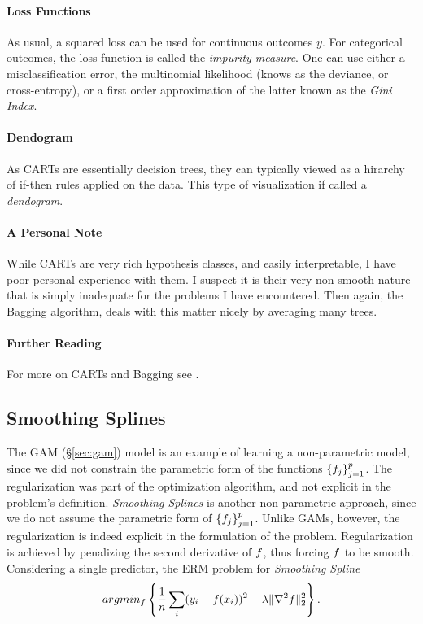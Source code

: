 \paragraph{Loss Functions}
As usual, a squared loss can be used for continuous outcomes $y$.
For categorical outcomes, the loss function is called the \emph{impurity measure}.
One can use either a misclassification error, the multinomial likelihood (knows as the deviance, or cross-entropy), or a first order approximation of the latter known as the \emph{Gini Index}.


\paragraph{Dendogram}
As CARTs are essentially decision trees, they can typically viewed as a hirarchy of if-then rules applied on the data.
This type of visualization if called a \emph{dendogram}.

\paragraph{A Personal Note}
While CARTs are very rich hypothesis classes, and easily interpretable, I have poor personal experience with them. 
I suspect it is their very non smooth nature that is simply inadequate for the problems I have encountered.
Then again, the Bagging algorithm, deals with this matter nicely by averaging many trees.


\paragraph{Further Reading}
For more on CARTs and Bagging see \citep[Section 9]{hastie_elements_2003}.



\subsection{Smoothing Splines}
\label{sec:smoothing_splines}
The GAM (\S\ref{sec:gam}) model is an example of learning a non-parametric model, since we did not constrain the parametric form of the functions $\left\{ f_j \right\}_{j=1}^p$. The regularization was part of the optimization algorithm, and not explicit in the problem's definition.
\emph{Smoothing Splines} is another non-parametric approach, since we do not assume the parametric form of $\left\{ f_j \right\}_{j=1}^p$. 
Unlike GAMs, however, the regularization is indeed explicit in the formulation of the problem. 
Regularization is achieved by penalizing the second derivative of $f$, thus forcing $f$ to be smooth. 
Considering a single predictor, the ERM problem for \emph{Smoothing Spline}
\begin{align}
\label{eq:smoothing_spline}
	 argmin_{f}\left\{ \frac{1}{n}\sum_i (y_i-f(x_i))^2 + \lambda \Vert \nabla^2 f \Vert_2^2   \right\}.
\end{align}

